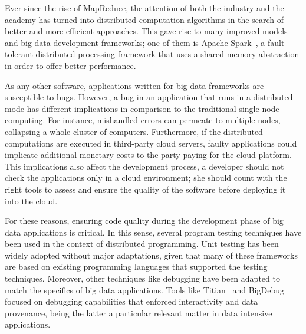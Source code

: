 Ever since the rise of MapReduce, the attention of both the industry and the academy has turned into distributed computation algorithms in the search of better and more efficient approaches. This gave rise to many improved models and big data development frameworks; one of them is Apache Spark~\cite{Zaharia2012a}, a fault-tolerant distributed processing framework that uses a shared memory abstraction in order to offer better performance.






As any other software, applications written for big data frameworks are susceptible to bugs. However, a bug in an application that runs in a distributed mode has different implications in comparison to the traditional single-node computing. For instance, mishandled errors can permeate to multiple nodes, collapsing a whole cluster of computers. Furthermore, if the distributed computations are executed in third-party cloud servers, faulty applications could implicate additional monetary costs to the party paying for the cloud platform. This implications also affect the development process, a developer should not check the applications only in a cloud environment; she should count with the right tools to assess and ensure the quality of the software before deploying it into the cloud.

For these reasons, ensuring code quality during the development phase of big data applications is critical. In this sense, several program testing techniques have been used in the context of distributed programming. Unit testing has been widely adopted without major adaptations, given that many of these frameworks are based on existing programming languages that supported the testing techniques. Moreover, other techniques like debugging have been adapted to match the specifics of big data applications. Tools like Titian~\cite{Interlandi2015} and BigDebug~\cite{Gulzar2016} focused on debugging capabilities that enforced interactivity and data provenance, being the latter a particular relevant matter in data intensive applications.

